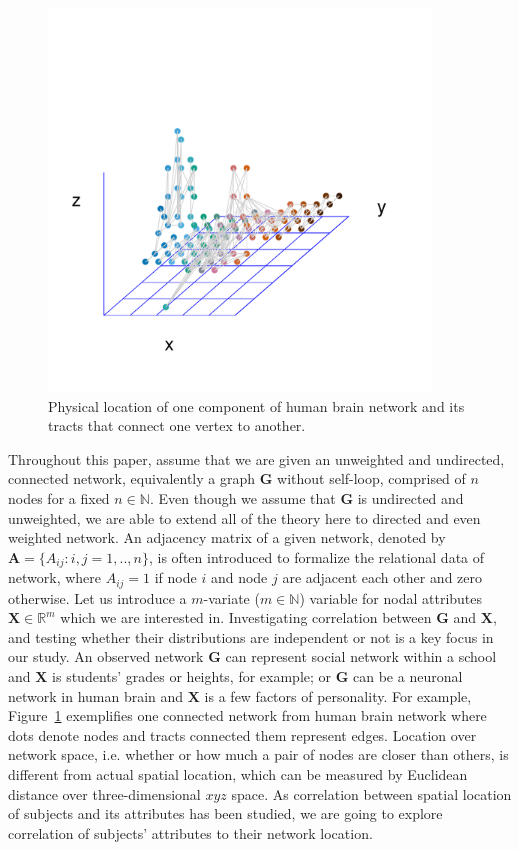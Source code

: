 \documentclass[12pt]{article}
\theoremstyle{definition}
\begin{document}
\begin{figure}[h]
	\centering
	\includegraphics[width=4in]{../Figure/intro.pdf}	
	\caption{Physical location of one component of human brain network and its tracts that connect one vertex to another.}
	\label{fig:intro}
\end{figure}

Throughout this paper, assume that we are given an unweighted and undirected, connected network, equivalently a graph $\mathbf{G}$ without self-loop, comprised of $n$ nodes for a fixed $n \in \mathbb{N}$. Even though we assume that $\boldsymbol{G}$ is undirected and unweighted, we are able to extend all of the theory here to directed and even weighted network. An adjacency matrix of a given network, denoted by $\mathbf{A} = \{A_{ij} : i,j= 1,..,n \}$, is often introduced to formalize the relational data of network, where $A_{ij} = 1$ if node $i$ and node $j$ are adjacent each other and zero otherwise. Let us introduce a $m$-variate ($m \in \mathbb{N}$) variable for nodal attributes $\boldsymbol{X}  \in \mathbb{R}^{m}$ which we are interested in. Investigating correlation between $\boldsymbol{G}$ and $\boldsymbol{X}$, and testing whether their distributions are independent or not is a key focus in our study. An observed network $\mathbf{G}$ can represent social network within a school and $\boldsymbol{X}$ is students' grades or heights, for example; or $\mathbf{G}$ can be a neuronal network in human brain and $\boldsymbol{X}$ is a few factors of personality. For example, Figure~\ref{fig:intro} exemplifies one connected network from human brain network where dots denote nodes and tracts connected them represent edges. Location over network space, i.e. whether or how much a pair of nodes are closer than others, is different from actual spatial location, which can be measured by Euclidean distance over three-dimensional $xyz$ space. As correlation between spatial location of subjects and its attributes has been studied, we are going to explore correlation of subjects' attributes to their network location. 
	
\end{document}
